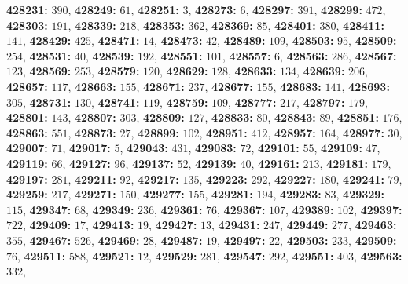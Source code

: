 \textsf{\bfseries 428231:} $390$, \textsf{\bfseries 428249:} $61$, \textsf{\bfseries 428251:} $3$, \textsf{\bfseries 428273:} $6$, \textsf{\bfseries 428297:} $391$, \textsf{\bfseries 428299:} $472$, \textsf{\bfseries 428303:} $191$, \textsf{\bfseries 428339:} $218$, \textsf{\bfseries 428353:} $362$, \textsf{\bfseries 428369:} $85$, \textsf{\bfseries 428401:} $380$, \textsf{\bfseries 428411:} $141$, \textsf{\bfseries 428429:} $425$, \textsf{\bfseries 428471:} $14$, \textsf{\bfseries 428473:} $42$, \textsf{\bfseries 428489:} $109$, \textsf{\bfseries 428503:} $95$, \textsf{\bfseries 428509:} $254$, \textsf{\bfseries 428531:} $40$, \textsf{\bfseries 428539:} $192$, \textsf{\bfseries 428551:} $101$, \textsf{\bfseries 428557:} $6$, \textsf{\bfseries 428563:} $286$, \textsf{\bfseries 428567:} $123$, \textsf{\bfseries 428569:} $253$, \textsf{\bfseries 428579:} $120$, \textsf{\bfseries 428629:} $128$, \textsf{\bfseries 428633:} $134$, \textsf{\bfseries 428639:} $206$, \textsf{\bfseries 428657:} $117$, \textsf{\bfseries 428663:} $155$, \textsf{\bfseries 428671:} $237$, \textsf{\bfseries 428677:} $155$, \textsf{\bfseries 428683:} $141$, \textsf{\bfseries 428693:} $305$, \textsf{\bfseries 428731:} $130$, \textsf{\bfseries 428741:} $119$, \textsf{\bfseries 428759:} $109$, \textsf{\bfseries 428777:} $217$, \textsf{\bfseries 428797:} $179$, \textsf{\bfseries 428801:} $143$, \textsf{\bfseries 428807:} $303$, \textsf{\bfseries 428809:} $127$, \textsf{\bfseries 428833:} $80$, \textsf{\bfseries 428843:} $89$, \textsf{\bfseries 428851:} $176$, \textsf{\bfseries 428863:} $551$, \textsf{\bfseries 428873:} $27$, \textsf{\bfseries 428899:} $102$, \textsf{\bfseries 428951:} $412$, \textsf{\bfseries 428957:} $164$, \textsf{\bfseries 428977:} $30$, \textsf{\bfseries 429007:} $71$, \textsf{\bfseries 429017:} $5$, \textsf{\bfseries 429043:} $431$, \textsf{\bfseries 429083:} $72$, \textsf{\bfseries 429101:} $55$, \textsf{\bfseries 429109:} $47$, \textsf{\bfseries 429119:} $66$, \textsf{\bfseries 429127:} $96$, \textsf{\bfseries 429137:} $52$, \textsf{\bfseries 429139:} $40$, \textsf{\bfseries 429161:} $213$, \textsf{\bfseries 429181:} $179$, \textsf{\bfseries 429197:} $281$, \textsf{\bfseries 429211:} $92$, \textsf{\bfseries 429217:} $135$, \textsf{\bfseries 429223:} $292$, \textsf{\bfseries 429227:} $180$, \textsf{\bfseries 429241:} $79$, \textsf{\bfseries 429259:} $217$, \textsf{\bfseries 429271:} $150$, \textsf{\bfseries 429277:} $155$, \textsf{\bfseries 429281:} $194$, \textsf{\bfseries 429283:} $83$, \textsf{\bfseries 429329:} $115$, \textsf{\bfseries 429347:} $68$, \textsf{\bfseries 429349:} $236$, \textsf{\bfseries 429361:} $76$, \textsf{\bfseries 429367:} $107$, \textsf{\bfseries 429389:} $102$, \textsf{\bfseries 429397:} $722$, \textsf{\bfseries 429409:} $17$, \textsf{\bfseries 429413:} $19$, \textsf{\bfseries 429427:} $13$, \textsf{\bfseries 429431:} $247$, \textsf{\bfseries 429449:} $277$, \textsf{\bfseries 429463:} $355$, \textsf{\bfseries 429467:} $526$, \textsf{\bfseries 429469:} $28$, \textsf{\bfseries 429487:} $19$, \textsf{\bfseries 429497:} $22$, \textsf{\bfseries 429503:} $233$, \textsf{\bfseries 429509:} $76$, \textsf{\bfseries 429511:} $588$, \textsf{\bfseries 429521:} $12$, \textsf{\bfseries 429529:} $281$, \textsf{\bfseries 429547:} $292$, \textsf{\bfseries 429551:} $403$, \textsf{\bfseries 429563:} $332$, 
